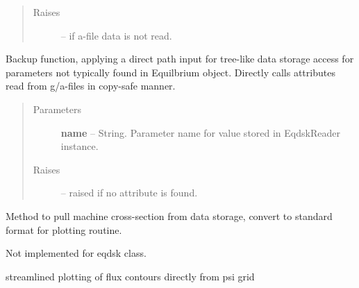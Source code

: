 \documentclass[letterpaper,10pt,english]{sphinxmanual}
\begin{document}
\begin{fulllineitems}
\begin{fulllineitems}
\begin{quote}
\begin{description}
\item[{Raises }] \leavevmode
{} -- 
if a-file data is not read.

\end{description}\end{quote}

\end{fulllineitems}


\begin{fulllineitems}
\label{eqtools:eqtools.eqdskreader.EqdskReader.getParam}
Backup function, applying a direct path input for tree-like data storage access
for parameters not typically found in Equilbrium object.  Directly calls attributes
read from g/a-files in copy-safe manner.
\begin{quote}\begin{description}
\item[{Parameters }] \leavevmode
\textbf{name} --
String.
Parameter name for value stored in EqdskReader instance.

\item[{Raises }] \leavevmode
{} -- 
raised if no attribute is found.

\end{description}\end{quote}

\end{fulllineitems}


\begin{fulllineitems}
\label{eqtools:eqtools.eqdskreader.EqdskReader.getMachineCrossSection}
Method to pull machine cross-section from data storage, convert to standard format for plotting routine.

Not implemented for eqdsk class.

\end{fulllineitems}


\begin{fulllineitems}
\label{eqtools:eqtools.eqdskreader.EqdskReader.plotFlux}
streamlined plotting of flux contours directly from psi grid

\end{fulllineitems}


\end{fulllineitems}
\end{document}
